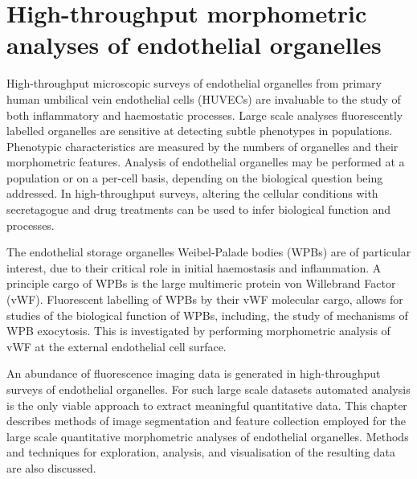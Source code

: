 \chapter{High-throughput morphometric analyses of endothelial organelles}
\label{endothelial_morphometry}
\ifpdf
	\graphicspath{{chapter_2/figs/}}
\fi


High-throughput microscopic surveys of endothelial organelles from primary human umbilical vein endothelial cells (HUVECs) are invaluable to the study of both inflammatory and haemostatic processes. Large scale analyses fluorescently labelled organelles are sensitive at detecting subtle phenotypes in populations. Phenotypic characteristics are measured by the numbers of organelles and their morphometric features. Analysis of endothelial organelles may be performed at a population or on a per-cell basis, depending on the biological question being addressed. In high-throughput surveys, altering the cellular conditions with secretagogue and drug treatments can be used to infer biological function and processes.

The endothelial storage organelles Weibel-Palade bodies (WPBs) are of particular interest, due to their critical role in initial haemostasis and inflammation. A principle cargo of WPBs is the large multimeric protein von Willebrand Factor (vWF). Fluorescent labelling of WPBs by their vWF molecular cargo, allows for studies of the biological function of WPBs, including, the study of mechanisms of WPB exocytosis. This is investigated by performing morphometric analysis of vWF at the external endothelial cell surface.

An abundance of fluorescence imaging data is generated in high-throughput surveys of endothelial organelles. For such large scale datasets automated analysis is the only viable approach to extract meaningful quantitative data. This chapter describes methods of image segmentation and feature collection employed for the large scale quantitative morphometric analyses of endothelial organelles. Methods and techniques for exploration, analysis, and visualisation of the resulting data are also discussed.

